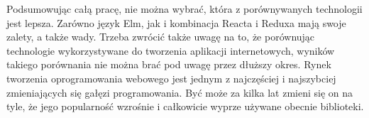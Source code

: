 Podsumowując całą pracę, nie można wybrać, która z porównywanych technologii jest lepsza. Zarówno język Elm, jak i kombinacja Reacta i Reduxa mają swoje zalety, a także wady. Trzeba zwrócić także uwagę na to, że porównując technologie wykorzystywane do tworzenia aplikacji internetowych, wyników takiego porównania nie można brać pod uwagę przez dłuższy okres. Rynek tworzenia oprogramowania webowego jest jednym z najczęściej i najszybciej zmieniających się gałęzi programowania. Być może za kilka lat zmieni się on na tyle, że jego popularność wzrośnie i całkowicie wyprze używane obecnie biblioteki. 